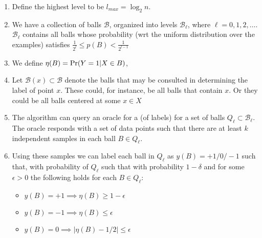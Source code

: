 \documentclass{article}
\def\pr{{\rm Pr}}
\def\B{{\mathcal B}}
\begin{document}
\begin{enumerate}
\item Define the highest level to be $l_{max} = \log_2 n$.
\item We have a collection of balls $\B$, organized into levels $\B_\ell$, where $\ell = 0, 1, 2, \ldots$. $\B_\ell$ contains all balls whose probability (wrt the uniform distribution over the examples) satisfies $\frac{1}{2^l} \leq p(B) < \frac{1}{2^{l-1}}$
\item We define $\eta(B) = \pr(Y=1|X \in B)$,

\item Let $\B(x) \subset \B$ denote the balls that may be consulted in determining the label of point $x$. These could, for instance, be all balls that contain $x$. Or they could be all balls centered at some $x \in X$

\item The algorithm can query an oracle for a (of labels) for a set of balls $Q_\ell \subset \B_\ell$. The oracle responds with a set of data points such that there are at least $k$ independent samples in each ball $B \in Q_\ell$.

\item
Using these samples we can label each ball in $Q_\ell$ as $y(B)=+1/0/-1$ such that, with probability of $Q_\ell$ such that with probability $1-\delta$ and for some $\epsilon>0$ the following holds for each $B \in Q_\ell$: 
\begin{itemize}    
\item $y(B) = +1 \implies \eta(B) \geq 1-\epsilon$
\item $y(B) = -1 \implies \eta(B) \leq \epsilon$
\item $y(B) = 0 \implies |\eta(B)-1/2| \leq \epsilon$
\end{itemize}


\end{enumerate}
\end{document}
